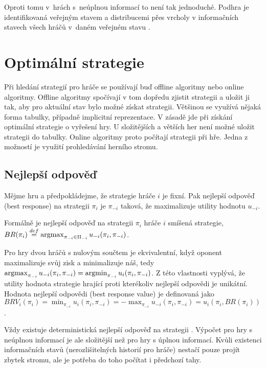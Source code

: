Oproti tomu v~hrách s~neúplnou informací to není tak jednoduché. Podhra je identifikovaná veřejným stavem a distribucemi přes vrcholy v informačních stavech všech hráčů v~daném veřejném stavu \cite{Schmid}.

\section{Optimální strategie}

Při hledání strategií pro hráče se používají buď offline algoritmy nebo online algoritmy. 
Offline algoritmy spočívají v tom dopředu zjistit strategii a uložit ji tak, aby pro aktuální stav bylo možné získat strategii. Většinou se využívá nějaká forma tabulky, případně implicitní reprezentace. V zásadě jde při získání optimální strategie o vyřešení hry.
U složitějších a větších her není možné uložit strategii do tabulky. Online algoritmy proto počítají strategii při hře. Jedna z možností je využití prohledávání herního stromu.

\subsection{Nejlepší odpověď}

Mějme hru a předpokládejme, že strategie hráče $i$ je fixní. Pak nejlepší odpověď (best response) na strategii $\pi_i$ je $\pi_{-i}$ taková, že maximalizuje utility hodnotu $u_{-i}$.

Formálně je nejlepší odpověď na strategii $\pi_i$ hráče $i$ smíšená strategie, $BR(\pi_i) \stackrel{def}{=} \operatorname*{argmax}_{\pi_{-i} \in \Pi_{-i}} u_{-i}(\pi_i, \pi_{-i})$. \cite{Schmid}

Pro hry dvou hráčů s nulovým součtem je ekvivalentní, když oponent maximalizuje svůj zisk a minimalizuje náš, tedy $\operatorname*{argmax}_{\pi_{-i}} u_{-i}(\pi_i, \pi_{-i}) = \operatorname*{argmin}_{\pi_{-i}} u_i(\pi_i, \pi_{-i})$. Z této vlastnosti vyplývá, že utility hodnota strategie hrající proti kterékoliv nejlepší odpovědi je unikátní. Hodnota nejlepší odpovědi (best response value) je definovaná jako $BRV_i(\pi_i) = \min_{\pi_{-i}} u_i(\pi_i, \pi_{-i}) = -\max_{\pi_{-i}} u_{-i}(\pi_i, \pi_{-i}) = u_i(\pi_i, BR(\pi_i))$. \cite{Schmid}

Vždy existuje deterministická nejlepší odpověď na strategii \cite{Balko}. Výpočet pro hry s neúplnou informací je ale složitější než pro hry s úplnou informací. Kvůli existenci informačních stavů (nerozlišitelných historií pro hráče) nestačí pouze projít zbytek stromu, ale je potřeba do toho počítat i předchozí tahy.

